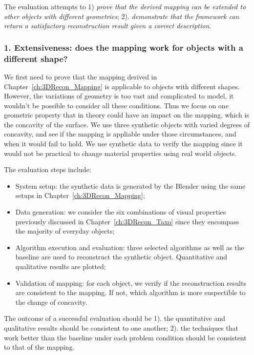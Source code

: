 The evaluation attempts to 1) \textit{prove that the derived mapping can be extended to other objects with different geometries}; 2). \textit{demonstrate that the framework can return a satisfactory reconstruction result given a correct description}.

\subsubsection{1. Extensiveness: does the mapping work for objects with a different shape?}
We first need to prove that the mapping derived in Chapter~\ref{ch:3DRecon_Mapping} is applicable to objects with different shapes. However, the variations of geometry is too vast and complicated to model, it wouldn't be possible to consider all these conditions. Thus we focus on one geometric property that in theory could have an impact on the mapping, which is the concavity of the surface. We use three synthetic objects with varied degrees of concavity, and see if the mapping is appliable under those circumstances, and when it would fail to hold. We use synthetic data to verify the mapping since it would not be practical to change material properties using real world objects.

The evaluation steps include:
\begin{itemize}
\item System setup: the synthetic data is generated by the Blender using the same setups in Chapter~\ref{ch:3DRecon_Mapping};
\item Data generation: we consider the six combinations of visual properties previously discussed in Chapter~\ref{ch:3DRecon_Taxo} since they encompass the majority of everyday objects;
\item Algorithm execution and evaluation: three selected algorithms as well as the baseline are used to reconstruct the synthetic object. Quantitative and qualitative results are plotted;
\item Validation of mapping: for each object, we verify if the reconstruction results are consistent to the mapping. If not, which algorithm is more suspectible to the change of concavity.
\end{itemize}

The outcome of a successful evaluation should be 1). the quantitative and qualitative results should be consistent to one another; 2). the techniques that work better than the baseline under each problem condition should be consistent to that of the mapping.

